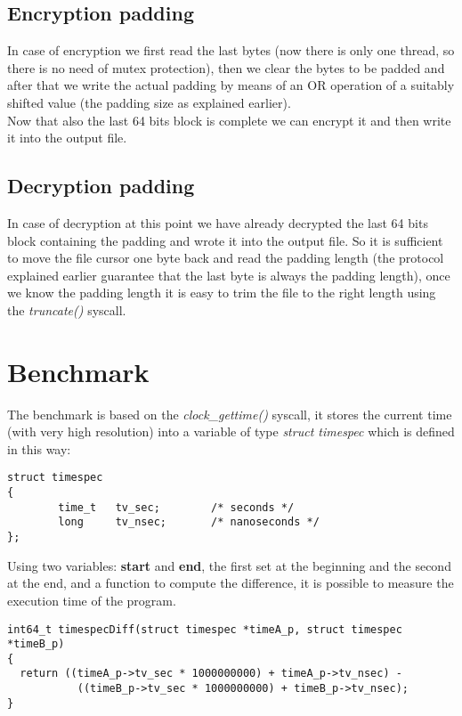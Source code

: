 \subsection{Encryption padding} 
In case of encryption we first read the last bytes (now there is only one thread, so there is no need of mutex protection), then we clear the bytes to be padded and after that we write the actual padding by means of an OR operation of a suitably shifted value (the padding size as explained earlier).\\
Now that also the last 64 bits block is complete we can encrypt it and then write it into the output file.

\subsection{Decryption padding} 
In case of decryption at this point we have already decrypted the last 64 bits block containing the padding and wrote it into the output file. So it is sufficient to move the file cursor one byte back and read the padding length (the protocol explained earlier guarantee that the last byte is always the padding length), once we know the padding length it is easy to trim the file to the right length using the \emph{truncate()} syscall.



\section{Benchmark}
The benchmark is based on the \emph{clock\_gettime()} syscall, it stores the current time (with very high resolution) into a variable of type \emph{struct timespec} which is defined in this way:

\begin{center}
\begin{lstlisting}
struct timespec 
{
        time_t   tv_sec;        /* seconds */
        long     tv_nsec;       /* nanoseconds */
};
\end{lstlisting}
\end{center}

Using two variables: \textbf{start} and \textbf{end}, the first set at the beginning and the second at the end, and a function to compute the difference, it is possible to measure the execution time of the program.

\begin{center}
\begin{lstlisting}
int64_t timespecDiff(struct timespec *timeA_p, struct timespec *timeB_p)
{
  return ((timeA_p->tv_sec * 1000000000) + timeA_p->tv_nsec) -
           ((timeB_p->tv_sec * 1000000000) + timeB_p->tv_nsec);
}
\end{lstlisting}
\end{center}

